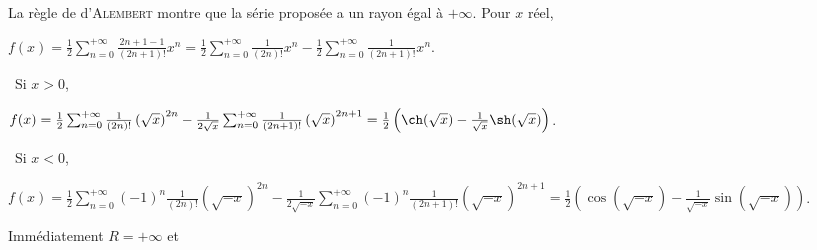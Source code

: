 {{\begin{center}
\shadowbox{
$\forall x\in]-1,1[$, $\sum_{n=0}^{+\infty}\frac{x^n}{2n+1}=\left\{
\begin{array}{l}
\frac{\Argth(\sqrt{x})}{\sqrt{x}}\;\text{si}\;x\in]0,1[\\
\rule[-2mm]{0mm}{4mm}1\;\text{si}\;x=0\\
\frac{\Arctan(\sqrt{-x})}{\sqrt{-x}}\;\text{si}\;x\in]-1,0[
\end{array}
\right.$.
}
\end{center}
La règle de d'\textsc{Alembert} montre que la série proposée a un rayon égal à $+\infty$. Pour $x$ réel, 

\begin{center}
$f(x) =\frac{1}{2}\sum_{n=0}^{+\infty}\frac{2n+1-1}{(2n+1)!}x^n=\frac{1}{2}\sum_{n=0}^{+\infty}\frac{1}{(2n)!}x^n-\frac{1}{2}\sum_{n=0}^{+\infty}\frac{1}{(2n+1)!}x^n$.
\end{center}

\textbullet~Si $x > 0$,  

\begin{center}
$f(x) =\frac{1}{2}\sum_{n=0}^{+\infty}\frac{1}{(2n)!}\left(\sqrt{x}\right)^{2n}-\frac{1}{2\sqrt{x}}\sum_{n=0}^{+\infty}\frac{1}{(2n+1)!}\left(\sqrt{x}\right)^{2n+1}=\frac{1}{2}\left(\ch(\sqrt{x})-\frac{1}{\sqrt{x}}\sh(\sqrt{x})\right)$.
\end{center}

\textbullet~Si $x<0$,  

\begin{center}
$f(x) =\frac{1}{2}\sum_{n=0}^{+\infty}(-1)^n\frac{1}{(2n)!}\left(\sqrt{-x}\right)^{2n}-\frac{1}{2\sqrt{-x}}\sum_{n=0}^{+\infty}(-1)^n\frac{1}{(2n+1)!}\left(\sqrt{-x}\right)^{2n+1}=\frac{1}{2}\left(\cos(\sqrt{-x})-\frac{1}{\sqrt{-x}}\sin(\sqrt{-x})\right)$.
\end{center}

\begin{center}
\end{center}
Immédiatement $R = +\infty$ et 

}}

